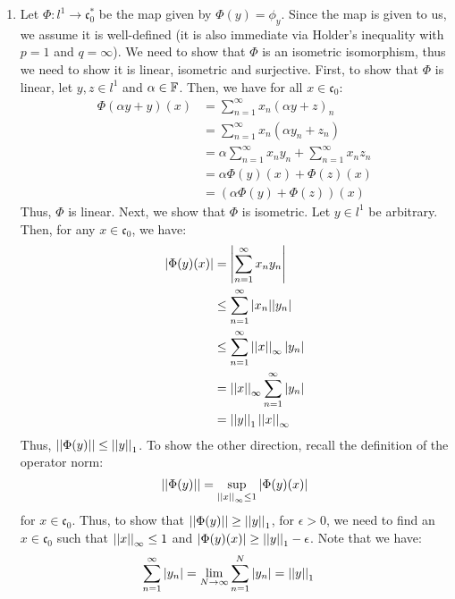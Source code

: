 \documentclass[12pt]{article}
\begin{document}
\begin{solution}
    \bbni
    \begin{enumerate}
        \item Let $\Phi: l^1 \to \mathfrak{c}_0^*$ be the map given by $\Phi(y) = \phi_y$. Since the map is given to us, we assume it is well-defined (it is also immediate via Holder's inequality with $p =1 $ and $q = \infty$). We need to show that $\Phi$ is an isometric isomorphism, thus we need to show it is linear, isometric and surjective. \bbni
        First, to show that $\Phi$ is linear, let $y, z \in l^1$ and $\alpha \in \mathbb F$. Then, we have for all $x \in \mathfrak{c}_0$:
        \begin{align*}
            \Phi(\alpha y + y )(x) &= \sum_{n=1}^\infty x_n(\alpha y + z)_n \\
            &= \sum_{n=1}^\infty x_n(\alpha y_n + z_n) \\
            &= \alpha \sum_{n=1}^\infty x_ny_n + \sum_{n=1}^\infty x_nz_n \\
            &= \alpha \Phi(y)(x) + \Phi(z)(x) \\
            &= (\alpha \Phi(y) + \Phi(z))(x)
        \end{align*}
        Thus, $\Phi$ is linear. Next, we show that $\Phi$ is isometric. Let $y \in l^1$ be arbitrary. Then, for any $x \in \mathfrak{c}_0$, we have:
        \begin{align*}
            |\Phi(y)(x)| &= \left|\sum_{n=1}^\infty x_ny_n\right| \\ 
            &\leq \sum_{n=1}^\infty |x_n||y_n| \\
            & \leq \sum_{n=1}^\infty \left\vert\left\vert x\right\vert\right\vert_\infty |y_n| \\
            & = \left\vert\left\vert x\right\vert\right\vert_\infty \sum_{n=1}^\infty |y_n| \\
            & = \left\vert\left\vert y\right\vert\right\vert_1 \left\vert\left\vert x\right\vert\right\vert_\infty 
        \end{align*}     
        Thus, $\left\vert\left\vert\Phi(y)\right\vert\right\vert \leq \left\vert\left\vert y\right\vert\right\vert_1$. To show the other direction, recall the definition of the operator norm:
        \[ \left\vert\left\vert\Phi(y)\right\vert\right\vert = \sup_{\left\vert\left\vert x\right\vert\right\vert_\infty \leq 1} |\Phi(y)(x)|\]
        for $x \in \mathfrak{c}_0$. Thus, to show that $\left\vert\left\vert\Phi(y)\right\vert\right\vert \geq \left\vert\left\vert y\right\vert\right\vert_1$, for $\epsilon > 0$, we need to find an $x \in \mathfrak{c}_0$ such that $\left\vert\left\vert x\right\vert\right\vert_\infty \leq 1$ and $|\Phi(y)(x)| \geq \left\vert\left\vert y\right\vert\right\vert_1 - \epsilon$. \bbni
        Note that we have:
        \begin{align*}
            \sum_{n=1}^\infty |y_n| &= \lim_{N \to \infty} \sum_{n=1}^N |y_n| = \left\vert\left\vert y\right\vert\right\vert_1
        \end{align*} 

\end{enumerate}
\end{solution}
\end{document}
